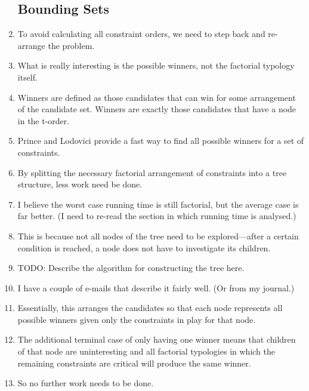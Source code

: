 \documentclass[11pt]{article}
\begin{document}
\begin{enumerate}
  \subsection{Bounding Sets}
\item To avoid calculating all constraint orders, we need to step back and
  re-arrange the problem.
\item What is really interesting is the possible winners, not the
  factorial typology itself.
\item Winners are defined as those candidates that can win for some arrangement
  of the candidate set. Winners are exactly those candidates that have a node in
  the t-order.
\item Prince and Lodovici provide a fast way to find all possible winners for a
  set of constraints.
\item By splitting the necessary factorial arrangement of constraints into a tree
  structure, less work need be done.
\item I believe the worst case running time is still factorial, but the average case
  is far better. (I need to re-read the section in which running time is analysed.)
\item This is because not all nodes of the tree need to be explored---after a
  certain condition is reached, a node does not have to investigate its children.
\item TODO: Describe the algorithm for constructing the tree here.
\item I have a couple of e-mails that describe it fairly well. (Or from my journal.)
\item Essentially, this arranges the candidates so that each node represents all
  possible winners given only the constraints in play for that node.
\item The additional terminal case of only having one winner means that
  children of that node are uninteresting and all factorial typologies in which the
  remaining constraints are critical will produce the same winner.
\item So no further work needs to be done.

\end{enumerate}
\end{document}
